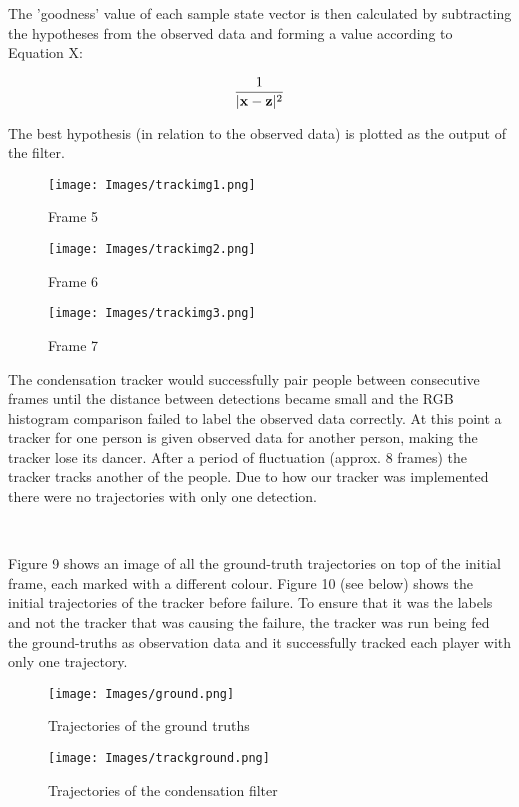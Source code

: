 \documentclass{article}
\begin{document}
The 'goodness' value of each sample state vector is then calculated by subtracting the hypotheses from the observed data and forming a value according to Equation X:

\begin{equation}
        \frac{1}{|\bold{x} - \bold{z}|^{2}}
\end{equation} 

The best hypothesis (in relation to the observed data) is plotted as the output of the filter.


\begin{figure}[!htb]
  \texttt{[image: Images/trackimg1.png]}
  \caption{Frame 5}\label{fig:awesome_image1}
\endminipage\hfill
{}
  \texttt{[image: Images/trackimg2.png]}
  \caption{Frame 6}\label{fig:awesome_image2}
\endminipage\hfill
{}%
  \texttt{[image: Images/trackimg3.png]}
  \caption{Frame 7}\label{fig:awesome_image3}
\endminipage
\end{figure}


The condensation tracker would successfully pair people between consecutive frames until the distance between detections became small and the RGB histogram comparison failed to label the observed data correctly. At this point a tracker for one person is given observed data for another person, making the tracker lose its dancer. After a period of fluctuation (approx. 8 frames) the tracker tracks another of the people. Due to how our tracker was implemented there were no trajectories with only one detection.


\

Figure 9 shows an image of all the ground-truth trajectories on top of the initial frame, each marked with a different colour. Figure 10 (see below) shows the initial trajectories of the tracker before failure. To ensure that it was the labels and not the tracker that was causing the failure, the tracker was run being fed the ground-truths as observation data and it successfully tracked each player with only one trajectory.

\begin{figure}[h]
    \centering
    \texttt{[image: Images/ground.png]} 
    \caption[b]{Trajectories of the ground truths}
\end{figure}

\begin{figure}[h]
    \centering
    \texttt{[image: Images/trackground.png]} 
    \caption[b]{Trajectories of the condensation filter}
\end{figure}
\end{document}
